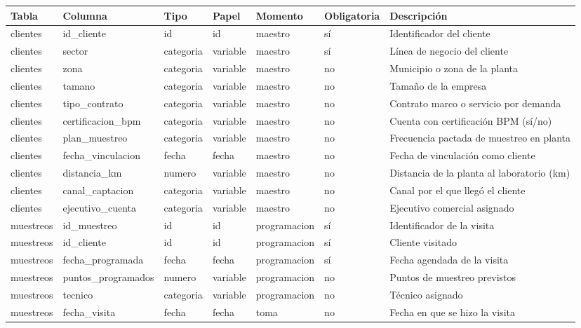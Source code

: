 \begin{tabular}{lllllll}
\toprule
Tabla & Columna & Tipo & Papel & Momento & Obligatoria & Descripción \\
\midrule
clientes & id\_cliente & id & id & maestro & sí & Identificador del cliente \\
clientes & sector & categoria & variable & maestro & sí & Línea de negocio del cliente \\
clientes & zona & categoria & variable & maestro & no & Municipio o zona de la planta \\
clientes & tamano & categoria & variable & maestro & no & Tamaño de la empresa \\
clientes & tipo\_contrato & categoria & variable & maestro & no & Contrato marco o servicio por demanda \\
clientes & certificacion\_bpm & categoria & variable & maestro & no & Cuenta con certificación BPM (sí/no) \\
clientes & plan\_muestreo & categoria & variable & maestro & no & Frecuencia pactada de muestreo en planta \\
clientes & fecha\_vinculacion & fecha & fecha & maestro & no & Fecha de vinculación como cliente \\
clientes & distancia\_km & numero & variable & maestro & no & Distancia de la planta al laboratorio (km) \\
clientes & canal\_captacion & categoria & variable & maestro & no & Canal por el que llegó el cliente \\
clientes & ejecutivo\_cuenta & categoria & variable & maestro & no & Ejecutivo comercial asignado \\
muestreos & id\_muestreo & id & id & programacion & sí & Identificador de la visita \\
muestreos & id\_cliente & id & id & programacion & sí & Cliente visitado \\
muestreos & fecha\_programada & fecha & fecha & programacion & sí & Fecha agendada de la visita \\
muestreos & puntos\_programados & numero & variable & programacion & no & Puntos de muestreo previstos \\
muestreos & tecnico & categoria & variable & programacion & no & Técnico asignado \\
muestreos & fecha\_visita & fecha & fecha & toma & no & Fecha en que se hizo la visita \\

\end{tabular}
